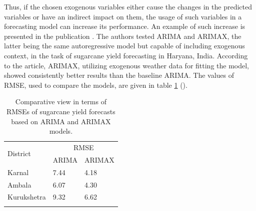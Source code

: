 \documentclass[3p,times,procedia]{elsarticle}
\begin{document}
Thus, if the chosen exogenous variables either cause the changes in the predicted variables or have an indirect impact on them, the usage of such variables in a forecasting model can increase its performance. An example of such increase is presented in the publication \cite{verma2022arima}. The authors tested ARIMA and ARIMAX, the latter being the same autoregressive model but capable of including exogenous context, in the task of sugarcane yield forecasting in Haryana, India. According to the article, ARIMAX, utilizing exogenous weather data for fitting the model, showed consistently better results than the baseline ARIMA. The values of RMSE, used to compare the models, are given in table \ref{tab:t3} (\cite{verma2022arima}).

\begin{table}[h]
\caption{Comparative view in terms of RMSEs of sugarcane yield forecasts based on ARIMA and ARIMAX models.}
\label{tab:t3}
\begin{tabular*}{\hsize}{@{\extracolsep{\fill}}lll@{}}
\toprule
\multirow{2}{*}{District} & \multicolumn{2}{c}{RMSE} \\
 & ARIMA & ARIMAX \\
\colrule
Karnal & 7.44 & 4.18 \\
Ambala & 6.07 & 4.30 \\
Kurukshetra & 9.32 & 6.62 \\
\botrule
\end{tabular*}
\end{table}
\end{document}
